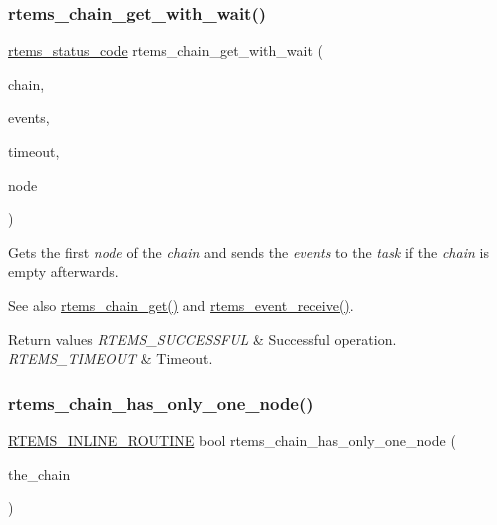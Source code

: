 \subsubsection{\texorpdfstring{rtems\_chain\_get\_with\_wait()}{rtems\_chain\_get\_with\_wait()}}
{\footnotesize\ttfamily \mbox{\hyperlink{group__ClassicStatus_ga545d41846817eaba6143d52ee4d9e9fe}{rtems\+\_\+status\+\_\+code}} rtems\+\_\+chain\+\_\+get\+\_\+with\+\_\+wait (\begin{DoxyParamCaption}\item[{\mbox{\hyperlink{unionChain__Control}{rtems\+\_\+chain\+\_\+control}} $\ast$}]{chain,  }\item[{\mbox{\hyperlink{group__ClassicEventSet_gab7b8f373bea85fd4e3b7ae23905faa07}{rtems\+\_\+event\+\_\+set}}}]{events,  }\item[{\mbox{\hyperlink{group__ClassicTasks_gad39c43f949683d46874e3a5586b93aee}{rtems\+\_\+interval}}}]{timeout,  }\item[{\mbox{\hyperlink{structChain__Node__struct}{rtems\+\_\+chain\+\_\+node}} $\ast$$\ast$}]{node }\end{DoxyParamCaption})}



Gets the first {\itshape node} of the {\itshape chain} and sends the {\itshape events} to the {\itshape task} if the {\itshape chain} is empty afterwards. 

\begin{DoxySeeAlso}{See also}
\mbox{\hyperlink{group__ClassicChains_ga46e031f6b5fddb8e9aedae6e82496bde}{rtems\+\_\+chain\+\_\+get()}} and \mbox{\hyperlink{group__ClassicEvent_ga87a7b47e1856045e4361f5619ad697cb}{rtems\+\_\+event\+\_\+receive()}}.
\end{DoxySeeAlso}

\begin{DoxyRetVals}{Return values}
{\em R\+T\+E\+M\+S\+\_\+\+S\+U\+C\+C\+E\+S\+S\+F\+UL} & Successful operation. \\
\hline
{\em R\+T\+E\+M\+S\+\_\+\+T\+I\+M\+E\+O\+UT} & Timeout. \\
\hline
\end{DoxyRetVals}
\mbox{\label{group__ClassicChains_ga9a734f3572a98fd660c3914760c0bc73}} 
\subsubsection{\texorpdfstring{rtems\_chain\_has\_only\_one\_node()}{rtems\_chain\_has\_only\_one\_node()}}
{\footnotesize\ttfamily \mbox{\hyperlink{group__RTEMSScoreBaseDefs_gac216239df231d5dbd15e3520b0b9313f}{R\+T\+E\+M\+S\+\_\+\+I\+N\+L\+I\+N\+E\+\_\+\+R\+O\+U\+T\+I\+NE}} bool rtems\+\_\+chain\+\_\+has\+\_\+only\+\_\+one\+\_\+node (\begin{DoxyParamCaption}\item[{const \mbox{\hyperlink{unionChain__Control}{rtems\+\_\+chain\+\_\+control}} $\ast$}]{the\+\_\+chain }\end{DoxyParamCaption})}



